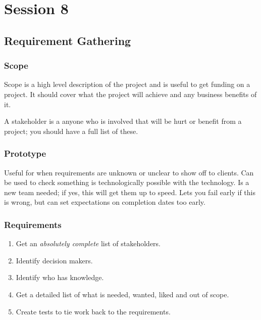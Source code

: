 \section{Session 8}\label{sec:session_8}

\subsection{Requirement Gathering}\label{sub:requirement_gathering}

\subsubsection{Scope}\label{ssub:scope}

Scope is a high level description of the project and is useful to get funding on a project.
It should cover what the project will achieve and any business benefits of it.

A stakeholder is a anyone who is involved that will be hurt or benefit from a project; you should have a full list of these.

\subsubsection{Prototype}\label{ssub:prototype}

Useful for when requirements are unknown or unclear to show off to clients.
Can be used to check something is technologically possible with the technology.
Is a new team needed; if yes, this will get them up to speed.
Lets you fail early if this is wrong, but can set expectations on completion dates too early.

\subsubsection{Requirements}\label{ssub:requirements}

\begin{enumerate}
    \item Get an \emph{absolutely complete} list of stakeholders.
    \item Identify decision makers.
    \item Identify who has knowledge.
    \item Get a detailed list of what is needed, wanted, liked and out of scope.
    \item Create tests to tie work back to the requirements.
\end{enumerate}

